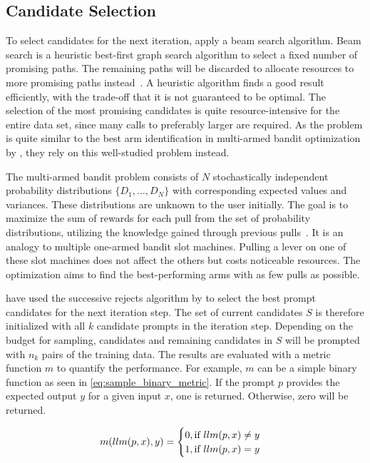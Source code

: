\subsection{Candidate Selection}
To select candidates for the next iteration, \citeauthor{pryzant2023AutomaticPrompt} apply a beam search algorithm.
Beam search is a heuristic best-first graph search algorithm to select a fixed number of promising paths.
The remaining paths will be discarded to allocate resources to more promising paths instead~\cite{BeamSearch}.
A heuristic algorithm finds a good result efficiently, with the trade-off that it is not guaranteed to be optimal.
The selection of the most promising candidates is quite resource-intensive for the entire data set, since many calls to preferably larger \LLMs are required.
As the problem is quite similar to the best arm identification in multi-armed bandit optimization by , they rely on this well-studied problem instead.

The multi-armed bandit problem consists of $N$ stochastically independent probability distributions $\{ D_1, \dots, D_N\}$ with corresponding expected values and variances.
These distributions are unknown to the user initially.
The goal is to maximize the sum of rewards for each pull from the set of probability distributions, utilizing the knowledge gained through previous pulls~\cite{kuleshov2014AlgorithmsMultiarmeda}.
It is an analogy to multiple one-armed bandit slot machines.
Pulling a lever on one of these slot machines does not affect the others but costs noticeable resources.
The optimization aims to find the best-performing arms with as few pulls as possible.

\citeauthor{pryzant2023AutomaticPrompt} have used the successive rejects algorithm by  to select the best prompt candidates for the next iteration step.
The set of current candidates $S$ is therefore initialized with all $k$ candidate prompts in the iteration step.
Depending on the budget for sampling, candidates and remaining candidates in $S$ will be prompted with $n_k$ pairs of the training data.
The results are evaluated with a metric function $m$ to quantify the performance.
For example, $m$ can be a simple binary function as seen in \autoref{eq:sample_binary_metric}.
If the prompt $p$ provides the expected output $y$ for a given input $x$, one is returned.
Otherwise, zero will be returned.

\begin{equation}
\label{eq:sample_binary_metric}
    m(llm(p, x), y) = 
    \begin{cases}
        0, \text{if $llm(p, x) \neq y$}\\
        1, \text{if $llm(p, x) = y$}
    \end{cases}
\end{equation}


